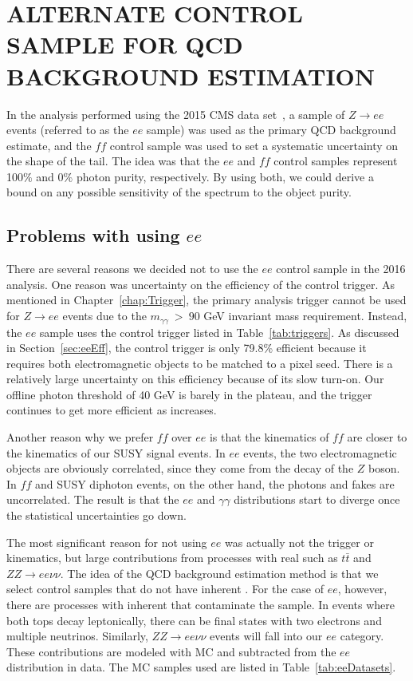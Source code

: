 \chapter{ALTERNATE CONTROL SAMPLE FOR QCD BACKGROUND ESTIMATION}
\label{app:ee}
In the analysis performed using the 2015 CMS data set~\cite{CMS:2015_anal}, 
a sample of $Z\rightarrow ee$ events (referred to as the $ee$ sample) was used as the 
primary QCD background estimate, and the $ff$ control 
sample was used to set a systematic uncertainty on the shape of the \ETmiss tail.
The idea was that the $ee$ and $ff$ control samples represent
100$\%$ and 0$\%$ photon purity, respectively. By using both, we could
derive a bound on any possible sensitivity of the \ETmiss spectrum
to the object purity. 

\section{Problems with using $ee$}
\label{sec:eeProblems}
There are several reasons we decided not to use the $ee$ control sample
 in the 2016 analysis. One reason was uncertainty on 
 the efficiency of the control 
 trigger. As mentioned in Chapter~\ref{chap:Trigger},
the primary analysis trigger 
cannot be used for $Z\rightarrow ee$ events due to the $m_{\gamma\gamma}~>~90$ GeV
invariant mass requirement. Instead, the $ee$ sample uses the control trigger 
listed in Table~\ref{tab:triggers}. As discussed in Section~\ref{sec:eeEff}, the
control trigger is only 79.8\% efficient because it 
requires both electromagnetic objects to be matched to a 
pixel seed. There is a relatively 
large uncertainty on this efficiency because of its
slow turn-on. Our offline photon \pT threshold of 40 GeV is 
barely in the plateau, and the trigger continues to get more efficient 
as \pT increases. 

Another reason why we prefer $ff$ over $ee$ is that the kinematics
of $ff$ are closer to the kinematics of our SUSY signal events.
In $ee$ events, the two electromagnetic objects are obviously correlated, 
since they come from the decay of the $Z$ boson. In $ff$ and SUSY diphoton
events, on the other hand, the photons and fakes are uncorrelated. The result
is that the $ee$ and $\gamma\gamma$ \ETmiss distributions start to diverge
once the statistical uncertainties go down. 

The most significant reason for not using $ee$ was actually 
not the trigger or kinematics, but large contributions from processes with real \ETmiss 
 such as $t\bar{t}$ and $ZZ\rightarrow ee\nu\nu$. 
The idea of the QCD background estimation method is that we 
select control samples that do not have inherent \ETmiss. 
For the case of $ee$, however,
there are processes with inherent \ETmiss that contaminate
the sample. 
In \ttbar events where both tops decay leptonically,
there can be final states with two electrons and
multiple neutrinos. Similarly, $ZZ \rightarrow ee\nu\nu$
events will fall into our $ee$ category.
These contributions are modeled with MC and subtracted 
from the $ee$ distribution in data. 
The MC samples used are listed in
Table~\ref{tab:eeDatasets}.

